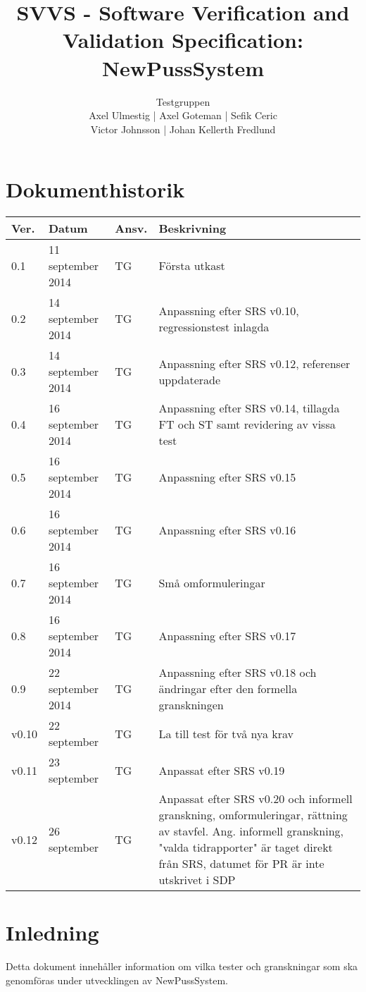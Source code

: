 \documentclass[a4paper]{article}
\title{SVVS - Software Verification and Validation Specification: NewPussSystem}
\author{Testgruppen \\ Axel Ulmestig | Axel Goteman | Sefik Ceric \\ Victor Johnsson | Johan Kellerth Fredlund}
\date{}
\begin{document}
\maketitle
\thispagestyle{fancy}
\tableofcontents
\newpage

\section*{Dokumenthistorik}

\begin{tabular}{ l l l p{9cm} }
Ver. & Datum & Ansv. & Beskrivning \\\hline
0.1 & 11 september 2014 & TG & Första utkast \\
0.2 & 14 september 2014 & TG & Anpassning efter SRS v0.10, regressionstest inlagda \\
0.3 & 14 september 2014 & TG & Anpassning efter SRS v0.12, referenser uppdaterade\\
0.4 & 16 september 2014 & TG & Anpassning efter SRS v0.14, tillagda FT och ST samt revidering av vissa test\\
0.5 & 16 september 2014 & TG & Anpassning efter SRS v0.15\\
0.6 & 16 september 2014 & TG & Anpassning efter SRS v0.16\\
0.7 & 16 september 2014 & TG & Små omformuleringar \\
0.8 & 16 september 2014 & TG & Anpassning efter SRS v0.17\\
0.9 & 22 september 2014 & TG & Anpassning efter SRS v0.18 och ändringar efter den formella granskningen \\
v0.10 & 22 september & TG & La till test för två nya krav \\
v0.11 & 23 september & TG & Anpassat efter SRS v0.19 \\
v0.12 & 26 september & TG & Anpassat efter SRS v0.20 och informell granskning, omformuleringar, rättning av stavfel. Ang. informell granskning, "valda tidrapporter" är taget direkt från SRS, datumet för PR är inte utskrivet i SDP\\

\end{tabular}
\section{Inledning}       

Detta dokument innehåller information om vilka tester och granskningar som ska genomföras under utvecklingen av NewPussSystem.
\end{document}
